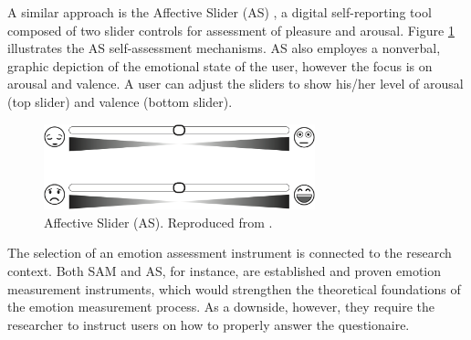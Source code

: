 A similar approach is the Affective Slider (AS) \parencite{betella2016affective}, a digital self-reporting tool composed of two slider controls for assessment of pleasure and arousal. Figure \ref{fig:as} illustrates the AS self-assessment mechanisms. AS also employes a nonverbal, graphic depiction of the emotional state of the user, however the focus is on arousal and valence. A user can adjust the sliders to show his/her level of arousal (top slider) and valence (bottom slider).

\begin{figure}[h]
    \centering
    \includegraphics[width=0.7\textwidth]{figures/AS.png}
    \caption{Affective Slider (AS). Reproduced from \textcite{betella2016affective}.}
    \label{fig:as}
\end{figure}

The selection of an emotion assessment instrument is connected to the research context. Both SAM and AS, for instance, are established and proven emotion measurement instruments, which would strengthen the theoretical foundations of the emotion measurement process. As a downside, however, they require the researcher to instruct users on how to properly answer the questionaire.

